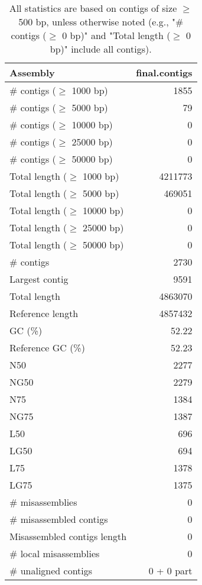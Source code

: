 \documentclass[12pt,a4paper]{article}
\begin{document}
\begin{table}[ht]
\begin{center}
\caption{All statistics are based on contigs of size $\geq$ 500 bp, unless otherwise noted (e.g., "\# contigs ($\geq$ 0 bp)" and "Total length ($\geq$ 0 bp)" include all contigs).}
\begin{tabular}{|l*{1}{|r}|}
\hline
Assembly & final.contigs \\ \hline
\# contigs ($\geq$ 1000 bp) & 1855 \\ \hline
\# contigs ($\geq$ 5000 bp) & 79 \\ \hline
\# contigs ($\geq$ 10000 bp) & 0 \\ \hline
\# contigs ($\geq$ 25000 bp) & 0 \\ \hline
\# contigs ($\geq$ 50000 bp) & 0 \\ \hline
Total length ($\geq$ 1000 bp) & 4211773 \\ \hline
Total length ($\geq$ 5000 bp) & 469051 \\ \hline
Total length ($\geq$ 10000 bp) & 0 \\ \hline
Total length ($\geq$ 25000 bp) & 0 \\ \hline
Total length ($\geq$ 50000 bp) & 0 \\ \hline
\# contigs & 2730 \\ \hline
Largest contig & 9591 \\ \hline
Total length & 4863070 \\ \hline
Reference length & 4857432 \\ \hline
GC (\%) & 52.22 \\ \hline
Reference GC (\%) & 52.23 \\ \hline
N50 & 2277 \\ \hline
NG50 & 2279 \\ \hline
N75 & 1384 \\ \hline
NG75 & 1387 \\ \hline
L50 & 696 \\ \hline
LG50 & 694 \\ \hline
L75 & 1378 \\ \hline
LG75 & 1375 \\ \hline
\# misassemblies & 0 \\ \hline
\# misassembled contigs & 0 \\ \hline
Misassembled contigs length & 0 \\ \hline
\# local misassemblies & 0 \\ \hline
\# unaligned contigs & 0 + 0 part \\ \hline

\end{tabular}
\end{center}
\end{table}
\end{document}
